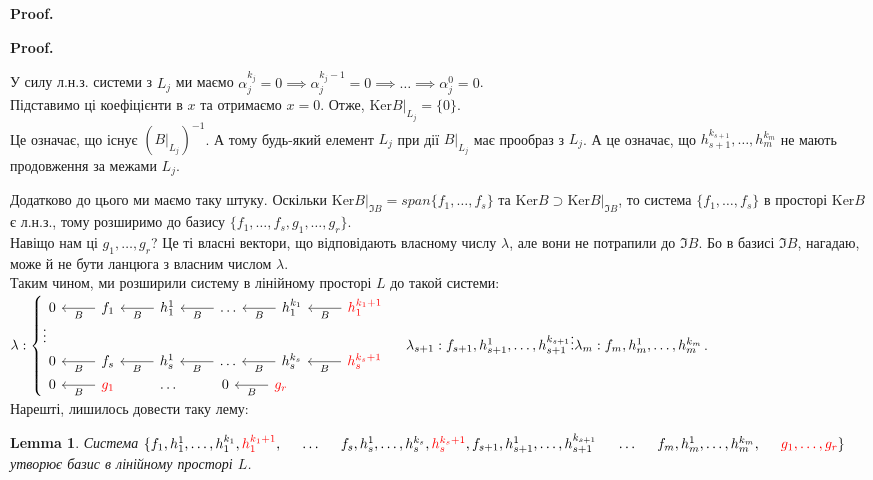 \documentclass[a4paper, 10pt]{article}
\makeatletter
\def\qed{$\blacksquare$}
\def\ker#1{\textrm{Ker} {#1}}
\theoremstyle{theoremdd}
\theoremstyle{theoremdd}
\theoremstyle{theoremdd}
\theoremstyle{theoremdd}
\theoremstyle{theoremdd}
\theoremstyle{theoremdd}
\theoremstyle{theoremdd}
\newtheorem{lemma}[theorem]{Lemma}
\theoremstyle{theoremdd}
\renewenvironment{proof}[1][Proof.\\]{\par
\pushQED{\hfill \qed}%
\normalfont \topsep6\p@\@plus6\p@\relax
\trivlist
\item\relax
{\bfseries
#1\@addpunct{.}}\hspace\labelsep\ignorespaces
}{%
\popQED\endtrivlist\@endpefalse
}
\makeatother
\begin{document}
\begin{proof}
\begin{proof}
У силу л.н.з. системи з $L_j$ ми маємо $\alpha_j^{k_j} = 0 \implies \alpha_j^{k_j-1} = 0 \implies \dots \implies \alpha_j^0 = 0$.\\
Підставимо ці коефіцієнти в $x$ та отримаємо $x = 0$. Отже, $\ker B|_{L_j} = \{0\}$.\\
Це означає, що існує $(B|_{L_j})^{-1}$. А тому будь-який елемент $L_j$ при дії $B|_{L_j}$ має прообраз з $L_j$. А це означає, що $h_{s+1}^{k_{s+1}},\dots,h_m^{k_m}$ не мають продовження за межами $L_{j}$.
\end{proof}

Додатково до цього ми маємо таку штуку. Оскільки $\ker B|_{\Im B} = span \{f_1,\dots,f_s\}$ та $\ker B \supset \ker B|_{\Im B}$, то система $\{f_1,\dots,f_s\}$ в просторі $\ker B$ є л.н.з., тому розширимо до базису $\{f_1,\dots,f_s,g_1,\dots,g_r\}$.\\
Навіщо нам ці $g_1,\dots,g_r$? Це ті власні вектори, що відповідають власному числу $\lambda$, але вони не потрапили до $\Im B$. Бо в базисі $\Im B$, нагадаю, може й не бути ланцюга з власним числом $\lambda$.
\bigskip \\
Таким чином, ми розширили систему в лінійному просторі $L$ до такой системи:\\
$ \lambda: \begin{cases}
\begin{tikzcd}
0 & f_1 \arrow{l}{B} & h_1^1 \arrow{l}{B} & \dots \arrow{l}{B} & h_1^{k_1} \arrow{l}{B} & \textcolor{red}{h_1^{k_1+1}} \arrow{l}{B}
\end{tikzcd}\\
\vdots \\
\begin{tikzcd}
0 & f_s \arrow{l}{B} & h_s^1 \arrow{l}{B} & \dots \arrow{l}{B} & h_s^{k_s} \arrow{l}{B} & \textcolor{red}{h_s^{k_s+1}} \arrow{l}{B}
\end{tikzcd}\\
\begin{tikzcd}
0 & \textcolor{red}{g_1} \arrow{l}{B} & \dots & 0 & \textcolor{red}{g_r} \arrow{l}{B} &
\end{tikzcd}
\end{cases}
\\
\lambda_{s+1}: f_{s+1}, h_{s+1}^1,\dots,h_{s+1}^{k_{s+1}}\\
\vdots\\
\lambda_m: f_{m}, h_{m}^1,\dots,h_{m}^{k_{m}}
$.\\
Нарешті, лишилось довести таку лему:
\begin{lemma}
Система $\{f_1,h_1^1,\dots,h_1^{k_1},\textcolor{red}{h_1^{k_1+1}}, \hspace{0.5cm} \dots \hspace{0.5cm} f_s, h_s^{1}, \dots,h_s^{k_s}, \textcolor{red}{h_s^{k_s+1}}, \\ f_{s+1}, h_{s+1}^1, \dots, h_{s+1}^{k_{s+1}} \hspace{0.5cm} \dots \hspace{0.5cm} f_{m}, h_{m}^1, \dots, h_{m}^{k_m}, \hspace{0.5cm} \textcolor{red}{g_1, \dots, g_r}\}$ утворює базис в лінійному просторі $L$.
\end{lemma}


\end{proof}
\end{document}
